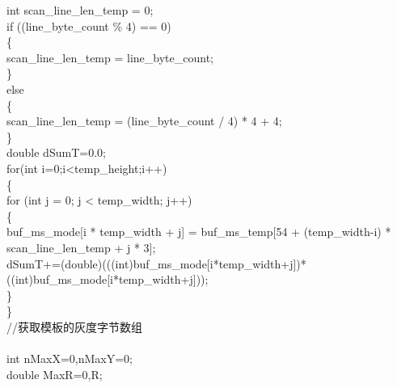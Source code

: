 ﻿\documentclass[12pt,a4paper,oneside]{book}
\begin{document}
\begin{enumerate}
\hspace*{4em}int scan\_line\_len\_temp = 0;\\
\hspace*{4em}if ((line\_byte\_count \% 4) == 0)\\
\hspace*{4em}\{\\
\hspace*{6em}scan\_line\_len\_temp = line\_byte\_count;\\
\hspace*{4em}\}\\
\hspace*{4em}else\\
\hspace*{4em}\{\\
\hspace*{6em}scan\_line\_len\_temp = (line\_byte\_count / 4) * 4 + 4;\\
\hspace*{4em}\}\\
\hspace*{4em}double dSumT=0.0;\\
\hspace*{4em}for(int i=0;i<temp\_height;i++)\\
\hspace*{4em}\{\\
\hspace*{6em}for (int j = 0; j < temp\_width; j++)  \\
\hspace*{6em}\{\\
\hspace*{8em}buf\_ms\_mode[i * temp\_width + j] = buf\_ms\_temp[54 + (temp\_width-i) * scan\_line\_len\_temp + j * 3];  \\
\hspace*{8em}dSumT+=(double)(((int)buf\_ms\_mode[i*temp\_width+j])*((int)buf\_ms\_mode[i*temp\_width+j]));\\
\hspace*{6em}\}\\
\hspace*{4em}\}\\
\hspace*{4em}//获取模板的灰度字节数组\\
\hspace*{4em}\\
\hspace*{4em}int nMaxX=0,nMaxY=0;\\
\hspace*{4em}double MaxR=0,R; \\

\end{enumerate}
\end{document}
